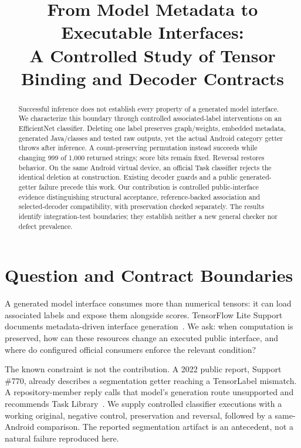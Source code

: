 \documentclass[10pt,conference]{IEEEtran}
\title{From Model Metadata to Executable Interfaces:\\A Controlled Study of Tensor Binding and Decoder Contracts}
\author{\IEEEauthorblockN{Anonymous author(s)}}
\begin{document}
\maketitle


\begin{abstract}
Successful inference does not establish every property of a generated model interface. We characterize this boundary through controlled associated-label interventions on an EfficientNet classifier. Deleting one label preserves graph/weights, embedded metadata, generated Java/classes and tested raw outputs, yet the actual Android category getter throws after inference. A count-preserving permutation instead succeeds while changing 999 of 1,000 returned strings; score bits remain fixed. Reversal restores behavior. On the same Android virtual device, an official Task classifier rejects the identical deletion at construction. Existing decoder guards and a public generated-getter failure precede this work. Our contribution is controlled public-interface evidence distinguishing structural acceptance, reference-backed association and selected-decoder compatibility, with preservation checked separately. The results identify integration-test boundaries; they establish neither a new general checker nor defect prevalence.
\end{abstract}

\section{Question and Contract Boundaries}
\label{sec:contracts}
A generated model interface consumes more than numerical tensors: it can load associated labels and expose them alongside scores. TensorFlow Lite Support documents metadata-driven interface generation~\cite{schema,codegen-doc}. We ask: when computation is preserved, how can these resources change an executed public interface, and where do configured official consumers enforce the relevant condition?

The known constraint is not the contribution. A 2022 public report, Support \#770, already describes a segmentation getter reaching a TensorLabel mismatch. A repository-member reply calls that model's generation route unsupported and recommends Task Library~\cite{support770,support770reply}. We supply controlled classifier executions with a working original, negative control, preservation and reversal, followed by a same-Android comparison. The reported segmentation artifact is an antecedent, not a natural failure reproduced here.
\end{document}
